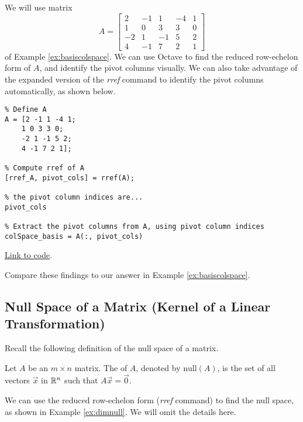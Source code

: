 \documentclass{ximera}
\begin{document}
\begin{template}\label{temp:colSpace}
We will use matrix $$A=\begin{bmatrix}2&-1&1&-4&1\\1&0&3&3&0\\-2&1&-1&5&2\\4&-1&7&2&1\end{bmatrix}$$
of Example \ref{ex:basiscolspace}.  We can use Octave to find the reduced row-echelon form of $A$, and identify the pivot columns visually.  We can also take advantage of the expanded version of the \emph{rref} command to identify the pivot columns automatically, as shown below.

\begin{verbatim}
% Define A
A = [2 -1 1 -4 1;
    1 0 3 3 0;
    -2 1 -1 5 2;
    4 -1 7 2 1];

% Compute rref of A
[rref_A, pivot_cols] = rref(A);

% the pivot column indices are...
pivot_cols

% Extract the pivot columns from A, using pivot column indices
colSpace_basis = A(:, pivot_cols)
\end{verbatim}

\href{https://sagecell.sagemath.org/?z=eJxtTkEKwjAQvAfyh7kULNhiqiIoHoL6Ao9SSq2JBmxTklR8vhssKOjuZWeGmdkEe6VNpyA5k9jiVCATEMgWEBvOQCMww5x2NuKsiLrAEsXILCJcgfiSGM4S7GzbD0HBOaVhdUw_xbuSU_TmYUPV2LsvqTCyE5mOvnBTbx2kD20H011Mozxqp_I85-xjfhsOz-DqJvwYPbSzLahu8Ka7_g3ljPCxrxtVnWtvPH0jJ-vvB9MX3FlRVA==&lang=octave&interacts=eJyLjgUAARUAuQ==}{Link to code}.

Compare these findings to our answer in Example \ref{ex:basiscolspace}.
\end{template}  

\subsection*{Null Space of a Matrix (Kernel of a Linear Transformation)}

Recall the following definition of the null space of a matrix.
\begin{definition}[\ref{def:nullspace}] Let $A$ be an $m\times n$ matrix.  The  of $A$, denoted by $\mbox{null}(A)$, is the set of all vectors $\vec{x}$ in $\mathbb{R}^n$ such that $A\vec{x}=\vec{0}$.
\end{definition}

We can use the reduced row-echelon form (\emph{rref} command) to find the null space, as shown in Example \ref{ex:dimnull}.  We will omit the details here.
\end{document}
